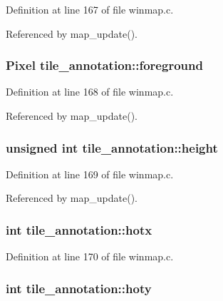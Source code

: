 Definition at line 167 of file winmap.\+c.



Referenced by map\+\_\+update().

\hypertarget{structtile__annotation_a1bc456a3e868aec0ecc8c92e6244fa59}{
\subsubsection[{foreground}]{\setlength{\rightskip}{0pt plus 5cm}Pixel tile\+\_\+annotation\+::foreground}}\label{structtile__annotation_a1bc456a3e868aec0ecc8c92e6244fa59}


Definition at line 168 of file winmap.\+c.



Referenced by map\+\_\+update().

\hypertarget{structtile__annotation_acf8b8bf29e89acd084f07e7b55e20c79}{
\subsubsection[{height}]{\setlength{\rightskip}{0pt plus 5cm}unsigned int tile\+\_\+annotation\+::height}}\label{structtile__annotation_acf8b8bf29e89acd084f07e7b55e20c79}


Definition at line 169 of file winmap.\+c.



Referenced by map\+\_\+update().

\hypertarget{structtile__annotation_a162bca91c97a60e8099c5f9305210258}{
\subsubsection[{hotx}]{\setlength{\rightskip}{0pt plus 5cm}int tile\+\_\+annotation\+::hotx}}\label{structtile__annotation_a162bca91c97a60e8099c5f9305210258}


Definition at line 170 of file winmap.\+c.

\hypertarget{structtile__annotation_ad2ca18d1296b8e792ee8e70bad9fd524}{
\subsubsection[{hoty}]{\setlength{\rightskip}{0pt plus 5cm}int tile\+\_\+annotation\+::hoty}}\label{structtile__annotation_ad2ca18d1296b8e792ee8e70bad9fd524}


